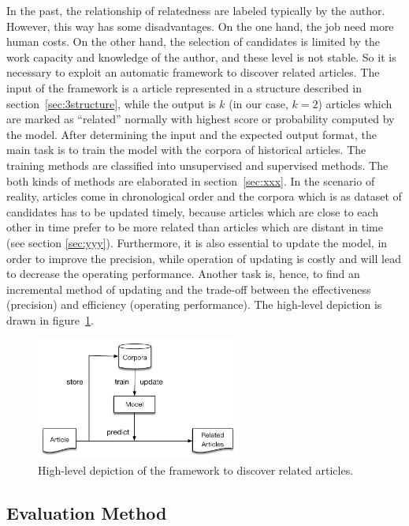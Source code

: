 In the past, the relationship of relatedness are labeled typically by the author. However, this way has some disadvantages. On the one hand, the job need more human costs. On the other hand, the selection of candidates is limited by the work capacity and knowledge of the author, and these level is not stable. So it is necessary to exploit an automatic framework to discover related articles. The input of the framework is a article represented in a structure described in section~\ref{sec:3structure}, while the output is $k$ (in our case, $k=2$) articles which are marked as ``related'' normally with highest score or probability computed by the model. After determining the input and the expected output format, the main task is to train the model with the corpora of historical articles. The training methods are classified into unsupervised and supervised methods. The both kinds of methods are elaborated in section~\ref{sec:xxx}. In the scenario of reality, articles come in chronological order and the corpora which is as dataset of candidates has to be updated timely, because articles which are close to each other in time prefer to be more related than articles which are distant in time (see section \ref{sec:yyy}). Furthermore, it is also essential to update the model, in order to improve the precision, while operation of updating is costly and will lead to decrease the operating performance. Another task is, hence, to find an incremental method of updating and the trade-off between the effectiveness (precision) and efficiency (operating performance). The high-level depiction is drawn in figure~\ref{fig:highlevel}. 

\begin{figure}[!htb]
    \centering
    \includegraphics[width=0.6\textwidth]{fig/high-level.pdf}
    \caption{High-level depiction of the framework to discover related articles. }
    \label{fig:highlevel}
\end{figure}

\subsection{Evaluation Method}
\label{sec:3.3}

